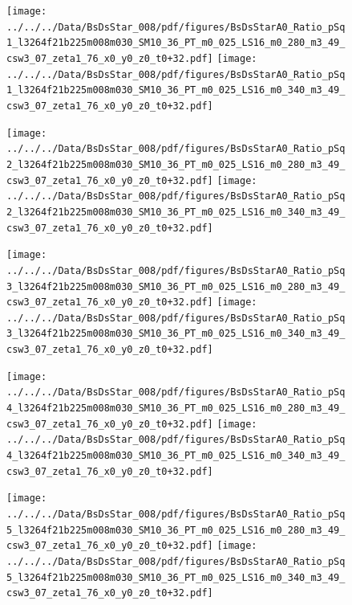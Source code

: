 \documentclass[a4paper,10pt]{article}
\begin{document}
\begin{figure}[p]
 \texttt{[image: ../../../Data/BsDsStar\_008/pdf/figures/BsDsStarA0\_Ratio\_pSq1\_l3264f21b225m008m030\_SM10\_36\_PT\_m0\_025\_LS16\_m0\_280\_m3\_49\_csw3\_07\_zeta1\_76\_x0\_y0\_z0\_t0+32.pdf]} 
 \texttt{[image: ../../../Data/BsDsStar\_008/pdf/figures/BsDsStarA0\_Ratio\_pSq1\_l3264f21b225m008m030\_SM10\_36\_PT\_m0\_025\_LS16\_m0\_340\_m3\_49\_csw3\_07\_zeta1\_76\_x0\_y0\_z0\_t0+32.pdf]} 
 \end{figure}
\begin{figure}[p]
 \texttt{[image: ../../../Data/BsDsStar\_008/pdf/figures/BsDsStarA0\_Ratio\_pSq2\_l3264f21b225m008m030\_SM10\_36\_PT\_m0\_025\_LS16\_m0\_280\_m3\_49\_csw3\_07\_zeta1\_76\_x0\_y0\_z0\_t0+32.pdf]} 
 \texttt{[image: ../../../Data/BsDsStar\_008/pdf/figures/BsDsStarA0\_Ratio\_pSq2\_l3264f21b225m008m030\_SM10\_36\_PT\_m0\_025\_LS16\_m0\_340\_m3\_49\_csw3\_07\_zeta1\_76\_x0\_y0\_z0\_t0+32.pdf]} 
 \end{figure}
\begin{figure}[p]
 \texttt{[image: ../../../Data/BsDsStar\_008/pdf/figures/BsDsStarA0\_Ratio\_pSq3\_l3264f21b225m008m030\_SM10\_36\_PT\_m0\_025\_LS16\_m0\_280\_m3\_49\_csw3\_07\_zeta1\_76\_x0\_y0\_z0\_t0+32.pdf]} 
 \texttt{[image: ../../../Data/BsDsStar\_008/pdf/figures/BsDsStarA0\_Ratio\_pSq3\_l3264f21b225m008m030\_SM10\_36\_PT\_m0\_025\_LS16\_m0\_340\_m3\_49\_csw3\_07\_zeta1\_76\_x0\_y0\_z0\_t0+32.pdf]} 
 \end{figure}
\clearpage
\begin{figure}[p]
 \texttt{[image: ../../../Data/BsDsStar\_008/pdf/figures/BsDsStarA0\_Ratio\_pSq4\_l3264f21b225m008m030\_SM10\_36\_PT\_m0\_025\_LS16\_m0\_280\_m3\_49\_csw3\_07\_zeta1\_76\_x0\_y0\_z0\_t0+32.pdf]} 
 \texttt{[image: ../../../Data/BsDsStar\_008/pdf/figures/BsDsStarA0\_Ratio\_pSq4\_l3264f21b225m008m030\_SM10\_36\_PT\_m0\_025\_LS16\_m0\_340\_m3\_49\_csw3\_07\_zeta1\_76\_x0\_y0\_z0\_t0+32.pdf]} 
 \end{figure}
\begin{figure}[p]
 \texttt{[image: ../../../Data/BsDsStar\_008/pdf/figures/BsDsStarA0\_Ratio\_pSq5\_l3264f21b225m008m030\_SM10\_36\_PT\_m0\_025\_LS16\_m0\_280\_m3\_49\_csw3\_07\_zeta1\_76\_x0\_y0\_z0\_t0+32.pdf]} 
 \texttt{[image: ../../../Data/BsDsStar\_008/pdf/figures/BsDsStarA0\_Ratio\_pSq5\_l3264f21b225m008m030\_SM10\_36\_PT\_m0\_025\_LS16\_m0\_340\_m3\_49\_csw3\_07\_zeta1\_76\_x0\_y0\_z0\_t0+32.pdf]} 
 \end{figure}
\clearpage
\end{document}
